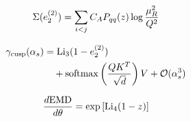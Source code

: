 \begin{equation}
  \Sigma(e_2^{(2)}) = \sum_{i<j} C_A P_{qq}(z) \log\frac{\mu_R^2}{Q^2}
  \label{eq:4}
\end{equation}

\begin{align}
  \gamma_{\rm cusp}(\alpha_s) &= \mathrm{Li}_{3}(1 - e_2^{(2)}) \nonumber \\
  &\quad + \mathrm{softmax}\left(\frac{Q K^T}{\sqrt{d}}\right) V + \mathcal{O}(\alpha_s^3) \label{eq:5}
\end{align}

\begin{equation}
  \frac{d \mathrm{EMD}}{d \theta} = \exp\left[\mathrm{Li}_{4}(1 - z)\right]
  \label{eq:7}
\end{equation}

